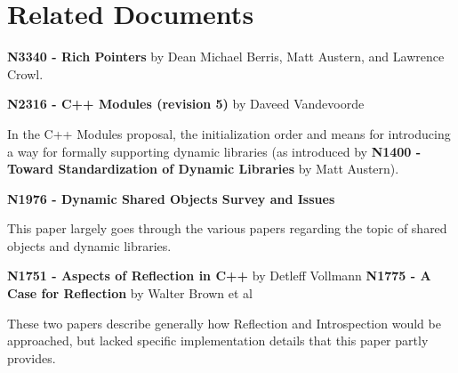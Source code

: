 \section{Related Documents}
\textbf{N3340 - Rich Pointers} by Dean Michael Berris, Matt Austern, and Lawrence Crowl.

\textbf{N2316 - C++ Modules (revision 5)} by Daveed Vandevoorde

In the C++ Modules proposal, the initialization order and means for
introducing a way for formally supporting dynamic libraries (as introduced by
\textbf{N1400 - Toward Standardization of Dynamic Libraries} by Matt Austern).

\textbf{N1976 - Dynamic Shared Objects Survey and Issues}

This paper largely goes through the various papers regarding the topic of
shared objects and dynamic libraries.

\textbf{N1751 - Aspects of Reflection in C++} by Detleff Vollmann
\textbf{N1775 - A Case for Reflection} by Walter Brown et al

These two papers describe generally how Reflection and Introspection would be
approached, but lacked specific implementation details that this paper partly
provides.




